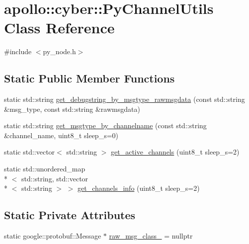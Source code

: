 \hypertarget{classapollo_1_1cyber_1_1PyChannelUtils}{\section{apollo\-:\-:cyber\-:\-:Py\-Channel\-Utils Class Reference}
\label{classapollo_1_1cyber_1_1PyChannelUtils}
}


{\ttfamily \#include $<$py\-\_\-node.\-h$>$}

\subsection*{Static Public Member Functions}
\begin{DoxyCompactItemize}
\item 
static std\-::string \hyperlink{classapollo_1_1cyber_1_1PyChannelUtils_a8997c2679558c43a3f0ec17c811f086d}{get\-\_\-debugstring\-\_\-by\-\_\-msgtype\-\_\-rawmsgdata} (const std\-::string \&msg\-\_\-type, const std\-::string \&rawmsgdata)
\item 
static std\-::string \hyperlink{classapollo_1_1cyber_1_1PyChannelUtils_a772358632a3dd2cf8b942c8f44213b02}{get\-\_\-msgtype\-\_\-by\-\_\-channelname} (const std\-::string \&channel\-\_\-name, uint8\-\_\-t sleep\-\_\-s=0)
\item 
static std\-::vector$<$ std\-::string $>$ \hyperlink{classapollo_1_1cyber_1_1PyChannelUtils_adb165c24a0eb5189bc344569c6c8eb30}{get\-\_\-active\-\_\-channels} (uint8\-\_\-t sleep\-\_\-s=2)
\item 
static std\-::unordered\-\_\-map\\*
$<$ std\-::string, std\-::vector\\*
$<$ std\-::string $>$ $>$ \hyperlink{classapollo_1_1cyber_1_1PyChannelUtils_a13a833541adf543076f97d6531139b1b}{get\-\_\-channels\-\_\-info} (uint8\-\_\-t sleep\-\_\-s=2)
\end{DoxyCompactItemize}
\subsection*{Static Private Attributes}
\begin{DoxyCompactItemize}
\item 
static google\-::protobuf\-::\-Message $\ast$ \hyperlink{classapollo_1_1cyber_1_1PyChannelUtils_a550b93539f7a24e67b3294439a69144c}{raw\-\_\-msg\-\_\-class\-\_\-} = nullptr
\end{DoxyCompactItemize}


